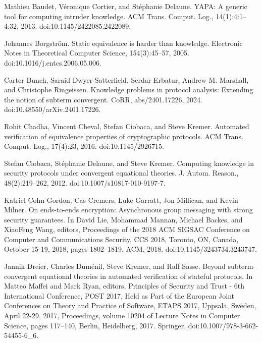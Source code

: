 \par\noindent  [8]  Mathieu Baudet, Véronique Cortier, and Stéphanie Delaune.  YAPA: A generic tool for computing intruder knowledge.  ACM Trans. Comput. Log., 14(1):4:1–4:32, 2013.  doi:10.1145/2422085.2422089.  
 
\par\noindent  [9]  Johannes Borgström.  Static equivalence is harder than knowledge.  Electronic Notes in Theoretical Computer Science, 154(3):45–57, 2005.  doi:10.1016/j.entcs.2006.05.006.  
 
\par\noindent  [10]  Carter Bunch, Saraid Dwyer Satterfield, Serdar Erbatur, Andrew M. Marshall, and Christophe Ringeissen.  Knowledge problems in protocol analysis: Extending the notion of subterm convergent.  CoRR, abs/2401.17226, 2024.  doi:10.48550/arXiv.2401.17226.  
 
\par\noindent  [11]  Rohit Chadha, Vincent Cheval, Stefan Ciobaca, and Steve Kremer.  Automated verification of equivalence properties of cryptographic protocols.  ACM Trans. Comput. Log., 17(4):23, 2016.  doi:10.1145/2926715.  
 
\par\noindent  [12]  Stefan Ciobaca, Stéphanie Delaune, and Steve Kremer.  Computing knowledge in security protocols under convergent equational theories.  J. Autom. Reason., 48(2):219–262, 2012.  doi:10.1007/s10817-010-9197-7.  
 
\par\noindent  [13]  Katriel Cohn-Gordon, Cas Cremers, Luke Garratt, Jon Millican, and Kevin Milner.  On ends-to-ends encryption: Asynchronous group messaging with strong security guarantees.  In David Lie, Mohammad Mannan, Michael Backes, and XiaoFeng Wang, editors, Proceedings of the 2018 ACM SIGSAC Conference on Computer and Communications Security, CCS 2018, Toronto, ON, Canada, October 15-19, 2018, pages 1802–1819. ACM, 2018.  doi:10.1145/3243734.3243747.  
 
\par\noindent  [14]  Jannik Dreier, Charles Duménil, Steve Kremer, and Ralf Sasse.  Beyond subterm-convergent equational theories in automated verification of stateful protocols.  In Matteo Maffei and Mark Ryan, editors, Principles of Security and Trust - 6th International Conference, POST 2017, Held as Part of the European Joint Conferences on Theory and Practice of Software, ETAPS 2017, Uppsala, Sweden, April 22-29, 2017, Proceedings, volume 10204 of Lecture Notes in Computer Science, pages 117–140, Berlin, Heidelberg, 2017. Springer.  doi:10.1007/978-3-662-54455-6\_6.  
 
